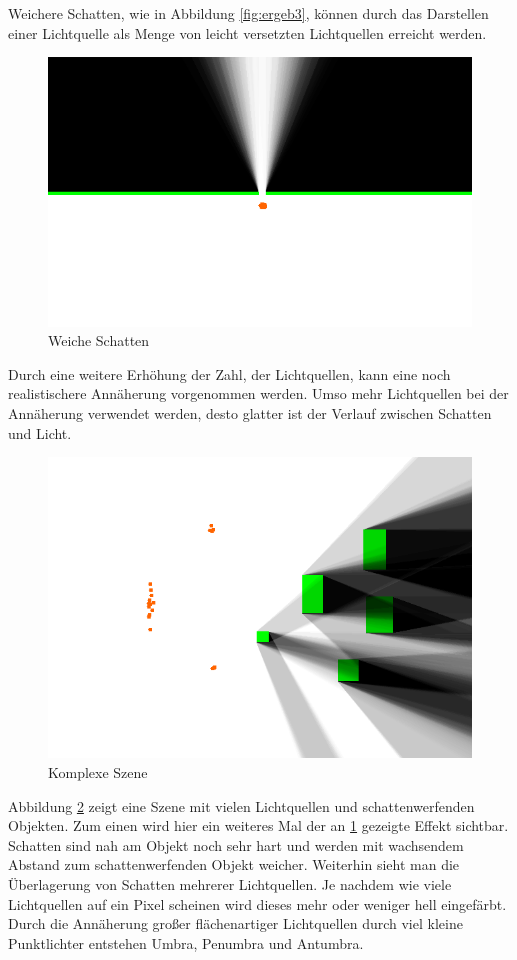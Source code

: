 Weichere Schatten, wie in Abbildung \ref{fig:ergeb3}, können durch das Darstellen einer Lichtquelle
als Menge von leicht versetzten Lichtquellen erreicht werden.

\begin{figure}[t]
	\centering
	\includegraphics[width=\columnwidth]{images/ergebnis.png}
	\caption{Weiche Schatten}
	\label{fig:ergeb2}
\end{figure}

Durch eine weitere Erhöhung der Zahl, der Lichtquellen, kann eine noch realistischere Annäherung
vorgenommen werden. Umso mehr Lichtquellen bei der Annäherung verwendet werden, desto glatter ist
der Verlauf zwischen Schatten und Licht.

\begin{figure}[t]
	\centering
	\includegraphics[width=\columnwidth]{images/ergebnis_4.png}
	\caption{Komplexe Szene}
	\label{fig:ergeb1}
\end{figure}

Abbildung \ref{fig:ergeb1} zeigt eine Szene mit vielen Lichtquellen und schattenwerfenden Objekten.
Zum einen wird hier ein weiteres Mal der an \ref{fig:ergeb2} gezeigte Effekt sichtbar. Schatten
sind nah am Objekt noch sehr hart und werden mit wachsendem Abstand zum schattenwerfenden Objekt
weicher. Weiterhin sieht man die Überlagerung von Schatten mehrerer Lichtquellen. Je nachdem wie
viele Lichtquellen auf ein Pixel scheinen wird dieses mehr oder weniger hell eingefärbt. Durch die
Annäherung großer flächenartiger Lichtquellen durch viel kleine Punktlichter entstehen Umbra,
Penumbra und Antumbra.
